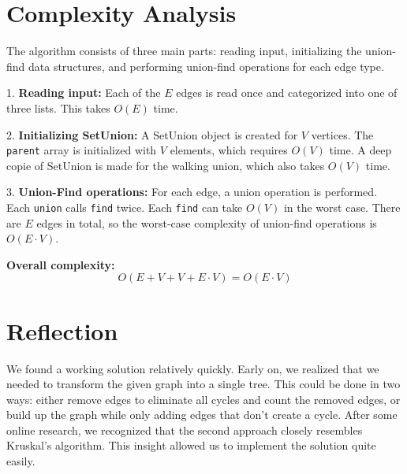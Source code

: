 \documentclass[a4paper]{article}
\begin{document}
\section{Complexity Analysis}
The algorithm consists of three main parts: reading input, initializing the union-find data structures, and performing union-find operations for each edge type. 

1. \textbf{Reading input:} Each of the $E$ edges is read once and categorized into one of three lists. This takes $O(E)$ time. 

2. \textbf{Initializing SetUnion:} A SetUnion object is created for $V$ vertices. The \texttt{parent} array is initialized with $V$ elements, which requires $O(V)$ time. A deep copie of SetUnion is made for the walking union, which also takes $O(V)$ time.

3. \textbf{Union-Find operations:} For each edge, a union operation is performed. Each \texttt{union} calls \texttt{find} twice. Each \texttt{find} can take $O(V)$ in the worst case. There are $E$ edges in total, so the worst-case complexity of union-find operations is $O(E \cdot V)$.  

\textbf{Overall complexity:}  
\[
O(E + V + V + E \cdot V) = O(E \cdot V)
\]
\section{Reflection}
We found a working solution relatively quickly. Early on, we realized that we needed to transform the given graph into a single tree. This could be done in two ways: either remove edges to eliminate all cycles and count the removed edges, or build up the graph while only adding edges that don’t create a cycle. After some online research, we recognized that the second approach closely resembles Kruskal’s algorithm. This insight allowed us to implement the solution quite easily.
\end{document}
